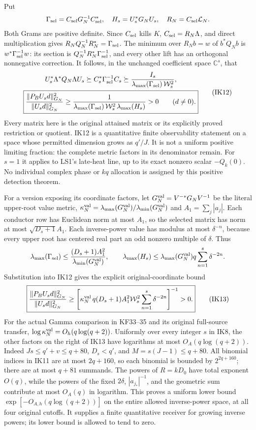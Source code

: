 \documentclass[11pt]{article}
\newcommand{\C}{\mathbb C}
\begin{document}
Put
\[
\Gamma_{\rm sel}=C_{\rm sel}G_N^{-1}C_{\rm sel}^*,\quad
H_s=U_s^*G_NU_s,\quad
R_N=C_{\rm sel}\mathcal L_N .
\]
Both Grams are positive definite. Since $C_{\rm sel}$ kills $K$,
$C_{\rm sel}=R_N\Lambda$, and direct multiplication gives
$R_NQ_N^{-1}R_N^*=\Gamma_{\rm sel}$.
The minimum over $R_Nb=w$ of $b^*Q_Nb$ is
$w^*\Gamma_{\rm sel}^{-1}w$:
its section is $Q_N^{-1}R_N^*\Gamma_{\rm sel}^{-1}$,
and every other lift has an orthogonal nonnegative correction.
It follows, in the unchanged coefficient space $\C^s$, that
\[
\begin{gathered}
U_s^*\Lambda^*Q_N\Lambda U_s
 \succeq C_s^*\Gamma_{\rm sel}^{-1}C_s
 \succeq\frac{I_s}
 {\lambda_{\max}(\Gamma_{\rm sel})\,\mathcal W_s^2},\\
\boxed{\frac{\|P_BU_sd\|_{G_N}^2}{\|U_sd\|_{G_N}^2}
 \ge
 \frac1{\lambda_{\max}(\Gamma_{\rm sel})\,
          \mathcal W_s^2\,\lambda_{\max}(H_s)}
 >0\qquad(d\ne0).}
\end{gathered}\tag{IK12}
\]
Every matrix here is the original attained matrix or its explicitly
proved restriction or quotient. IK12 is a quantitative finite
observability statement on a space whose permitted dimension grows
as $q'/J$. It is not a uniform positive limiting fraction:
the complete metric factors in its denominator remain.
For $s=1$ it applies to LS1's late-heat line, up to its exact
nonzero scalar $-Q_k(0)$. No individual complex phase or $kq$
allocation is assigned by this positive detection theorem.


For a version exposing its coordinate factors, let
$G_N^{\rm val}=V^{-*}G_NV^{-1}$ be the literal upper-root value metric,
$\kappa_N^{\rm val}=\lambda_{\max}(G_N^{\rm val})/
\lambda_{\min}(G_N^{\rm val})$ and $A_1=\sum_j|a_j|$.
Each conductor row has Euclidean norm at most $A_1$,
so the selected matrix has norm at most $\sqrt{D_s+1}A_1$.
Each inverse-power value has modulus at most $\delta^{-n}$,
because every upper root has centered real part an odd nonzero
multiple of $\delta$. Thus
\[
\lambda_{\max}(\Gamma_{\rm sel})
 \le\frac{(D_s+1)A_1^2}{\lambda_{\min}(G_N^{\rm val})},
\qquad
\lambda_{\max}(H_s)
 \le\lambda_{\max}(G_N^{\rm val})q\sum_{n=1}^s\delta^{-2n}.
\]
Substitution into IK12 gives the explicit original-coordinate bound
\[
\boxed{
\frac{\|P_BU_sd\|_{G_N}^2}{\|U_sd\|_{G_N}^2}
\ge
\left[
 \kappa_N^{\rm val}\,q(D_s+1)A_1^2\mathcal W_s^2
 \sum_{n=1}^s\delta^{-2n}
\right]^{-1}>0.}
\tag{IK13}
\]
For the actual Gamma comparison in KF33--35 and its original
full-source transfer, $\log\kappa_N^{\rm val}=O_h(q\log(q+2))$.
Uniformly over every integer $s$ in IK8, the other factors on the
right of IK13 have logarithms at most $O_A(q\log(q+2))$.
Indeed $Js\le q'+v\le q+80$, $D_s<q'$, and $M=s(J-1)\le q+80$.
All binomial indices in IK11 are at most $2q+160$, so each
binomial is bounded by $2^{2q+160}$; there are at most $q+81$
summands. The powers of $R=kD_0$ have total exponent $O(q)$,
while the powers of the fixed $2\delta$, $|a_{j_*}|^{-1}$,
and the geometric sum contribute at most $O_A(q)$ in logarithm.
This proves a uniform lower bound $\exp[-O_{A,h}(q\log(q+2))]$
on the entire allowed inverse-power space, at all four original cutoffs.
It supplies a finite quantitative receiver for growing inverse powers;
its lower bound is allowed to tend to zero.
\end{document}
